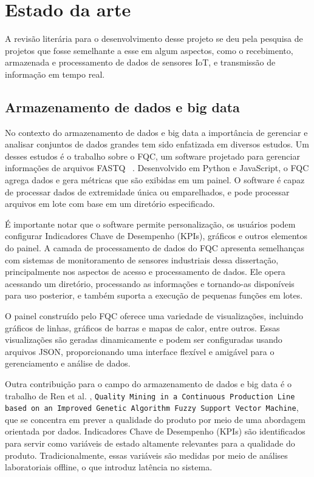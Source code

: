 \chapter{Estado da arte}\label{cap:conceptual}
A revisão literária para o desenvolvimento desse projeto se deu pela pesquisa de projetos que fosse semelhante a esse em algum aspectos, como o recebimento, armazenada e processamento de dados de sensores IoT, e transmissão de informação em tempo real.

\section{Armazenamento de dados e big data}

No contexto do armazenamento de dados e big data a importância de gerenciar e analisar conjuntos de dados grandes tem sido enfatizada em diversos estudos. Um desses estudos é o trabalho sobre o FQC, um software projetado para gerenciar informações de arquivos FASTQ ~\cite{fqc2017}. Desenvolvido em Python e JavaScript, o FQC agrega dados e gera métricas que são exibidas em um painel. O software é capaz de processar dados de extremidade única ou emparelhados, e pode processar arquivos em lote com base em um diretório especificado.

É importante notar que o software permite personalização, os usuários podem configurar Indicadores Chave de Desempenho (KPIs), gráficos e outros elementos do painel. A camada de processamento de dados do FQC apresenta semelhanças com sistemas de monitoramento de sensores industriais dessa dissertação, principalmente nos aspectos de acesso e processamento de dados. Ele opera acessando um diretório, processando as informações e tornando-as disponíveis para uso posterior, e também suporta a execução de pequenas funções em lotes.

O painel construído pelo FQC oferece uma variedade de visualizações, incluindo gráficos de linhas, gráficos de barras e mapas de calor, entre outros. Essas visualizações são geradas dinamicamente e podem ser configuradas usando arquivos JSON, proporcionando uma interface flexível e amigável para o gerenciamento e análise de dados.

Outra contribuição para o campo do armazenamento de dados e big data é o trabalho de Ren et al. \cite{ren2021data}, \texttt{Quality Mining in a Continuous Production Line based on an Improved Genetic Algorithm Fuzzy Support Vector Machine}, que se concentra em prever a qualidade do produto por meio de uma abordagem orientada por dados. Indicadores Chave de Desempenho (KPIs) são identificados para servir como variáveis de estado altamente relevantes para a qualidade do produto. Tradicionalmente, essas variáveis são medidas por meio de análises laboratoriais offline, o que introduz latência no sistema.

